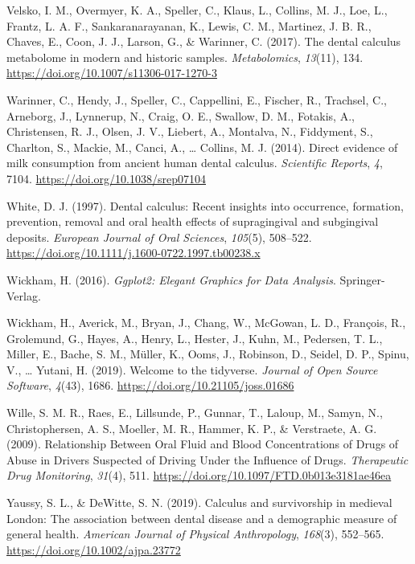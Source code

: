 \documentclass[
  b5paper,
]{book}
\newlength{\cslhangindent}
\newenvironment{CSLReferences}[2] %
 {\begin{list}{}{%
  \setlength{\itemindent}{0pt}
  \setlength{\leftmargin}{0pt}
  \setlength{\parsep}{0pt}
  \ifodd #1
   \setlength{\leftmargin}{\cslhangindent}
   \setlength{\itemindent}{-1\cslhangindent}
  \fi
  \setlength{\itemsep}{#2\baselineskip}}}
 {\end{list}}
\begin{document}
\begin{CSLReferences}{1}{0}
Velsko, I. M., Overmyer, K. A., Speller, C., Klaus, L., Collins, M. J.,
Loe, L., Frantz, L. A. F., Sankaranarayanan, K., Lewis, C. M., Martinez,
J. B. R., Chaves, E., Coon, J. J., Larson, G., \& Warinner, C. (2017).
The dental calculus metabolome in modern and historic samples.
\emph{Metabolomics}, \emph{13}(11), 134.
\url{https://doi.org/10.1007/s11306-017-1270-3}

Warinner, C., Hendy, J., Speller, C., Cappellini, E., Fischer, R.,
Trachsel, C., Arneborg, J., Lynnerup, N., Craig, O. E., Swallow, D. M.,
Fotakis, A., Christensen, R. J., Olsen, J. V., Liebert, A., Montalva,
N., Fiddyment, S., Charlton, S., Mackie, M., Canci, A., \ldots{}
Collins, M. J. (2014). Direct evidence of milk consumption from ancient
human dental calculus. \emph{Scientific Reports}, \emph{4}, 7104.
\url{https://doi.org/10.1038/srep07104}

White, D. J. (1997). Dental calculus: Recent insights into occurrence,
formation, prevention, removal and oral health effects of supragingival
and subgingival deposits. \emph{European Journal of Oral Sciences},
\emph{105}(5), 508--522.
\url{https://doi.org/10.1111/j.1600-0722.1997.tb00238.x}

Wickham, H. (2016). \emph{Ggplot2: {Elegant Graphics} for {Data
Analysis}}. {Springer-Verlag}.

Wickham, H., Averick, M., Bryan, J., Chang, W., McGowan, L. D.,
François, R., Grolemund, G., Hayes, A., Henry, L., Hester, J., Kuhn, M.,
Pedersen, T. L., Miller, E., Bache, S. M., Müller, K., Ooms, J.,
Robinson, D., Seidel, D. P., Spinu, V., \ldots{} Yutani, H. (2019).
Welcome to the {tidyverse}. \emph{Journal of Open Source Software},
\emph{4}(43), 1686. \url{https://doi.org/10.21105/joss.01686}

Wille, S. M. R., Raes, E., Lillsunde, P., Gunnar, T., Laloup, M., Samyn,
N., Christophersen, A. S., Moeller, M. R., Hammer, K. P., \& Verstraete,
A. G. (2009). Relationship {Between Oral Fluid} and {Blood
Concentrations} of {Drugs} of {Abuse} in {Drivers Suspected} of {Driving
Under} the {Influence} of {Drugs}. \emph{Therapeutic Drug Monitoring},
\emph{31}(4), 511. \url{https://doi.org/10.1097/FTD.0b013e3181ae46ea}

Yaussy, S. L., \& DeWitte, S. N. (2019). Calculus and survivorship in
medieval {London}: {The} association between dental disease and a
demographic measure of general health. \emph{American Journal of
Physical Anthropology}, \emph{168}(3), 552--565.
\url{https://doi.org/10.1002/ajpa.23772}


\end{CSLReferences}
\end{document}
